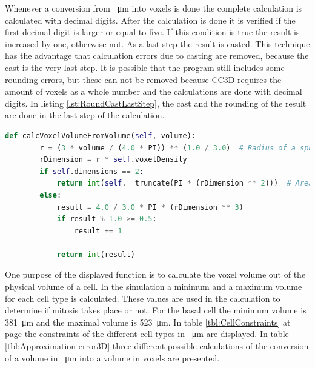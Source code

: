 Whenever a conversion from \SI{}{\micro\metre} into voxels is done the complete calculation is calculated with decimal digits. After the calculation is done it is verified if the first decimal digit is larger or equal to five. If this condition is true the result is increased by one, otherwise not. As a last step the result is casted. This technique has the advantage that calculation errors due to casting are removed, because the cast is the very last step. It is possible that the program still includes some rounding errors, but these can not be removed because \ac{CC3D} requires the amount of voxels as a whole number and the calculations are done with decimal digits. \newline
In listing \ref{lst:RoundCastLastStep}, the cast and the rounding of the result are done in the last step of the calculation.

\begin{lstlisting}[language=Python, caption = {[Modified function to calculate the volume of a cell in voxel out of a physical volume]Function to calculate the volume of a sphere in voxels out of a given physical volume. First out of the given physical volume the radius is calculated. Then it is converted into the voxel unit. Next\, the volume of the voxel sphere is calculated and as last step\, the result is rounded and casted.}, label=lst:RoundCastLastStep]
   def calcVoxelVolumeFromVolume(self, volume):
        r = (3 * volume / (4.0 * PI)) ** (1.0 / 3.0)  # Radius of a sphere with known volume.
        rDimension = r * self.voxelDensity
        if self.dimensions == 2:
            return int(self.__truncate(PI * (rDimension ** 2)))  # Area of a circle.
        else:
            result = 4.0 / 3.0 * PI * (rDimension ** 3)
            if result % 1.0 >= 0.5:
                result += 1

            return int(result)
\end{lstlisting}

One purpose of the displayed function is to calculate the voxel volume out of the physical volume of a cell. In the simulation a minimum and a maximum volume for each cell type is calculated. These values are used in the calculation to determine if mitosis takes place or not. \newline
For the basal cell the minimum volume is \SI{381}{\micro\metre} and the maximal volume is \SI{523}{\micro\metre}. In table \ref{tbl:CellConstraints} at page \pageref{tbl:CellConstraints} the constraints of the different cell types in \SI{}{\micro\metre} are displayed. In table \ref{tbl:Approximation error3D} three different possible calculations of the conversion of a volume in \SI{}{\micro\metre} into a volume in voxels are presented.

